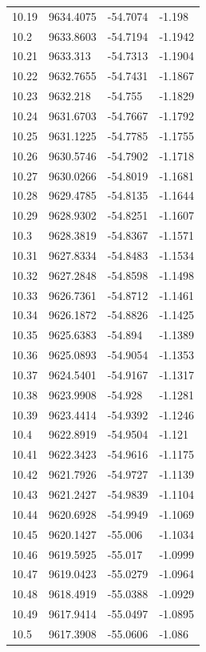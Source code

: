 \begin{table}[H]
\begin{tabular}{llll}
10.19 & 9634.4075 & -54.7074 & -1.198 \\
10.2 & 9633.8603 & -54.7194 & -1.1942 \\
10.21 & 9633.313 & -54.7313 & -1.1904 \\
10.22 & 9632.7655 & -54.7431 & -1.1867 \\
10.23 & 9632.218 & -54.755 & -1.1829 \\
10.24 & 9631.6703 & -54.7667 & -1.1792 \\
10.25 & 9631.1225 & -54.7785 & -1.1755 \\
10.26 & 9630.5746 & -54.7902 & -1.1718 \\
10.27 & 9630.0266 & -54.8019 & -1.1681 \\
10.28 & 9629.4785 & -54.8135 & -1.1644 \\
10.29 & 9628.9302 & -54.8251 & -1.1607 \\
10.3 & 9628.3819 & -54.8367 & -1.1571 \\
10.31 & 9627.8334 & -54.8483 & -1.1534 \\
10.32 & 9627.2848 & -54.8598 & -1.1498 \\
10.33 & 9626.7361 & -54.8712 & -1.1461 \\
10.34 & 9626.1872 & -54.8826 & -1.1425 \\
10.35 & 9625.6383 & -54.894 & -1.1389 \\
10.36 & 9625.0893 & -54.9054 & -1.1353 \\
10.37 & 9624.5401 & -54.9167 & -1.1317 \\
10.38 & 9623.9908 & -54.928 & -1.1281 \\
10.39 & 9623.4414 & -54.9392 & -1.1246 \\
10.4 & 9622.8919 & -54.9504 & -1.121 \\
10.41 & 9622.3423 & -54.9616 & -1.1175 \\
10.42 & 9621.7926 & -54.9727 & -1.1139 \\
10.43 & 9621.2427 & -54.9839 & -1.1104 \\
10.44 & 9620.6928 & -54.9949 & -1.1069 \\
10.45 & 9620.1427 & -55.006 & -1.1034 \\
10.46 & 9619.5925 & -55.017 & -1.0999 \\
10.47 & 9619.0423 & -55.0279 & -1.0964 \\
10.48 & 9618.4919 & -55.0388 & -1.0929 \\
10.49 & 9617.9414 & -55.0497 & -1.0895 \\
10.5 & 9617.3908 & -55.0606 & -1.086 \\

\end{tabular}
\end{table}
